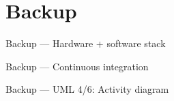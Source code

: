 %
%

\appendix
\section*{Backup}

\begin{frame}{Backup --- Hardware + software stack}
\end{frame}

\begin{frame}{Backup --- Continuous integration}
\end{frame}

\begin{frame}{Backup --- UML 4/6: Activity diagram}
\end{frame}


